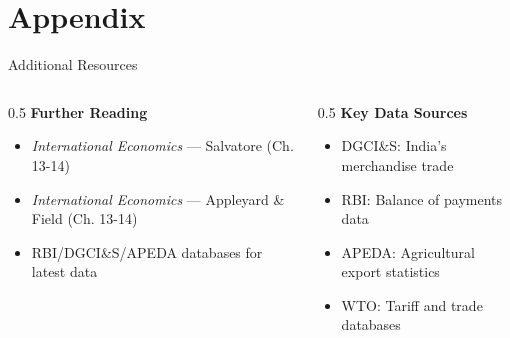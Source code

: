 \documentclass[
  ignorenonframetext,
  aspectratio=169,
]{beamer}
\makeatletter
\providecommand{\tightlist}{%
  \setlength{\itemsep}{0pt}\setlength{\parskip}{0pt}}
\let\quarto@originallabel\label
\DeclareRobustCommand*{\label}[1]{\quarto@originallabel{#1}}
\makeatother
\begin{document}
\section{Appendix}\label{appendix}

\begin{frame}{Additional Resources}
\label{additional-resources}
\begin{columns}[T]
\begin{column}{0.5\linewidth}
\textbf{Further Reading}

\begin{itemize}
\tightlist
\item
  \emph{International Economics} --- Salvatore (Ch. 13-14)
\item
  \emph{International Economics} --- Appleyard \& Field (Ch. 13-14)
\item
  RBI/DGCI\&S/APEDA databases for latest data
\end{itemize}
\end{column}

\begin{column}{0.5\linewidth}
\textbf{Key Data Sources}

\begin{itemize}
\tightlist
\item
  DGCI\&S: India's merchandise trade
\item
  RBI: Balance of payments data\\
\item
  APEDA: Agricultural export statistics
\item
  WTO: Tariff and trade databases
\end{itemize}
\end{column}
\end{columns}
\end{frame}
\end{document}
